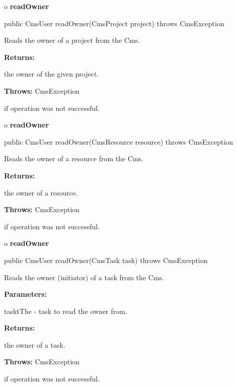 o {\bf readOwner}

\begin{PRE}
 public CmsUser readOwner(CmsProject project) throws CmsException
\end{PRE}

\begin{description}
\htmlDD Reads the owner of a project from the Cms.

\begin{description}
\item {\bf Returns:}

the owner of the given project.
\item {\bf Throws:} CmsException

if operation was not successful.
\end{description}

\end{description}

o {\bf readOwner}

\begin{PRE}
 public CmsUser readOwner(CmsResource resource) throws CmsException
\end{PRE}

\begin{description}
\htmlDD Reads the owner of a resource from the Cms.

\begin{description}
\item {\bf Returns:}

the owner of a resource.
\item {\bf Throws:} CmsException

if operation was not successful.
\end{description}

\end{description}

o {\bf readOwner}

\begin{PRE}
 public CmsUser readOwner(CmsTask task) throws CmsException
\end{PRE}

\begin{description}
\htmlDD Reads the owner (initiator) of a task from the Cms.

\begin{description}
\item {\bf Parameters:}

tasktThe - task to read the owner from.
\item {\bf Returns:}

the owner of a task.
\item {\bf Throws:} CmsException

if operation was not successful.
\end{description}

\end{description}

